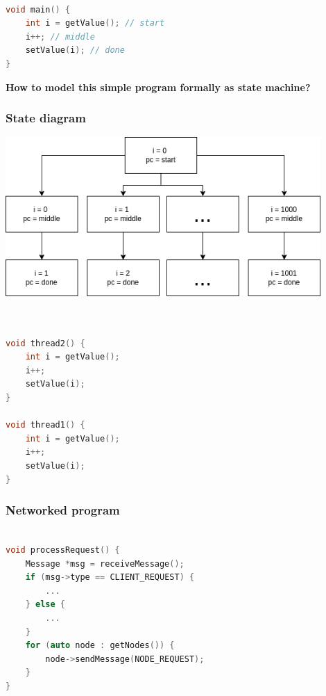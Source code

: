 \documentclass{beamer}
\begin{document}
\begin{frame}[fragile]
	\begin{lstlisting}[language=C++]

void main() {
    int i = getValue(); // start
    i++; // middle
    setValue(i); // done
}

	\end{lstlisting}
	
\end{frame}

\begin{frame}
    \begin{center}
        \LARGE{\textbf{How to model this simple program formally as state machine?}}
    \end{center}

\end{frame}

\begin{frame}
    \frametitle{State diagram}
    \includegraphics[width=0.9\textwidth, height=0.9\textheight]{img/1.png}
\end{frame}


\begin{frame}[fragile]
	\begin{lstlisting}[language=C++]


void thread2() {
    int i = getValue();
    i++;
    setValue(i);
}

void thread1() {
    int i = getValue();
    i++;
    setValue(i);
}

	\end{lstlisting}
	
\end{frame}

\begin{frame}[fragile]
    \frametitle{Networked program}
	\begin{lstlisting}[language=C++]

void processRequest() {
    Message *msg = receiveMessage();
    if (msg->type == CLIENT_REQUEST) {
        ...
    } else {
        ...
    }
    for (auto node : getNodes()) {
        node->sendMessage(NODE_REQUEST);
    }
}

	\end{lstlisting}
	
\end{frame}
\end{document}

